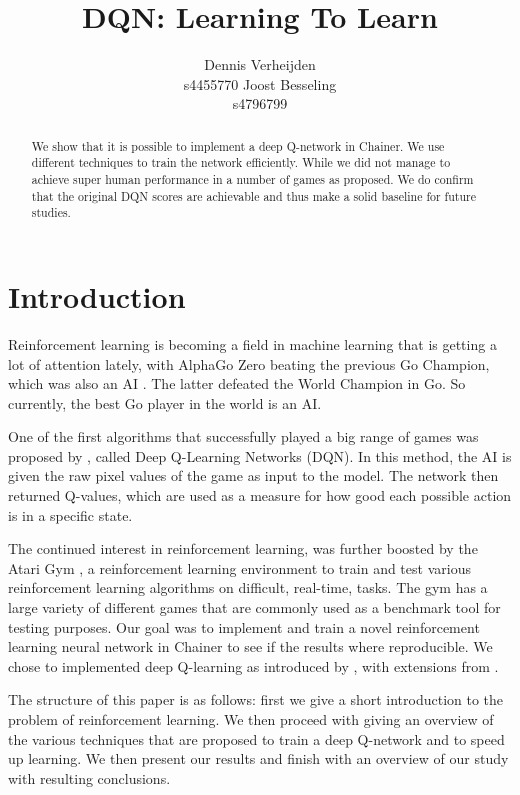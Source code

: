 \documentclass{article}
\title{DQN: Learning To Learn}
\author{
  Dennis Verheijden\\
  s4455770
  \And
  Joost Besseling\\
  s4796799
}
\begin{document}

\maketitle

\begin{abstract}
We show that it is possible to implement a deep Q-network in Chainer. We use different techniques to train the network efficiently. While we did not manage to achieve super human performance in a number of games as proposed. We do confirm that the original DQN scores are achievable and thus make a solid baseline for future studies.
\end{abstract}

\section{Introduction}
Reinforcement learning is becoming a field in machine learning that is getting a lot of attention lately, with AlphaGo Zero beating the previous Go Champion, which was also an AI \cite{silver2017mastering}. The latter defeated the World Champion in Go. So currently, the best Go player in the world is an AI.

One of the first algorithms that successfully played a big range of games was proposed by \citep{mnih2013playing}, called Deep Q-Learning Networks (DQN). In this method, the AI is given the raw pixel values of the game as input to the model. The network then returned Q-values, which are used as a measure for how good each possible action is in a specific state. 

The continued interest in reinforcement learning, was further boosted by the Atari Gym \cite{1606.01540}, a reinforcement learning environment to train and test various reinforcement learning algorithms on difficult, real-time, tasks. The gym has a large variety of different games that are commonly used as a benchmark tool for testing purposes. Our goal was to implement and train a novel reinforcement learning neural network in Chainer \cite{chainer_learningsys2015} to see if the results where reproducible. We chose to implemented deep Q-learning as introduced by \cite{mnih2013playing}, with extensions from \cite{mnih2015human}.

The structure of this paper is as follows: first we give a short introduction to the problem of reinforcement learning. We then proceed with giving an overview of the various techniques that are proposed to train a deep Q-network and to speed up learning. We then present our results and finish with an overview of our study with resulting conclusions.
\end{document}
